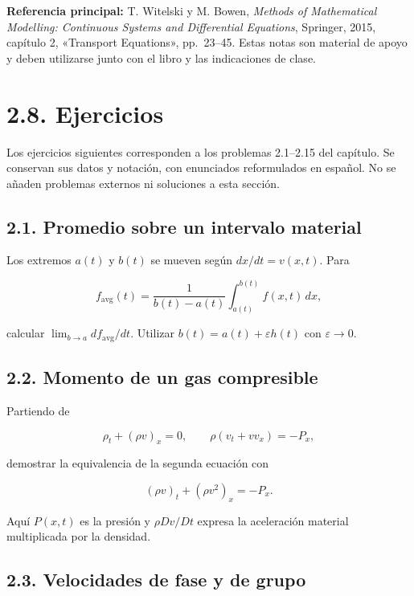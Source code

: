 \documentclass[11pt,a4paper]{article}
\begin{document}
\textbf{Referencia principal:} T. Witelski y M. Bowen, \emph{Methods of
Mathematical Modelling: Continuous Systems and Differential Equations},
Springer, 2015, capítulo 2, «Transport Equations», pp.~23--45. Estas
notas son material de apoyo y deben utilizarse junto con el libro y las
indicaciones de clase.

\hypertarget{ejercicios}{%
\section{2.8. Ejercicios}\label{ejercicios}}

Los ejercicios siguientes corresponden a los problemas 2.1--2.15 del
capítulo. Se conservan sus datos y notación, con enunciados reformulados
en español. No se añaden problemas externos ni soluciones a esta
sección.

\hypertarget{promedio-sobre-un-intervalo-material}{%
\subsection{2.1. Promedio sobre un intervalo
material}\label{promedio-sobre-un-intervalo-material}}

Los extremos \(a(t)\) y \(b(t)\) se mueven según \(dx/dt=v(x,t)\). Para

\[f_{\mathrm{avg}}(t)=\frac{1}{b(t)-a(t)}\int_{a(t)}^{b(t)}f(x,t)\,dx,\]

calcular \(\lim_{b\to a}df_{\mathrm{avg}}/dt\). Utilizar
\(b(t)=a(t)+\varepsilon h(t)\) con \(\varepsilon\to0\).

\hypertarget{momento-de-un-gas-compresible}{%
\subsection{2.2. Momento de un gas
compresible}\label{momento-de-un-gas-compresible}}

Partiendo de

\[\rho_t+(\rho v)_x=0,\qquad \rho(v_t+vv_x)=-P_x,\]

demostrar la equivalencia de la segunda ecuación con

\[(\rho v)_t+(\rho v^2)_x=-P_x.\]

Aquí \(P(x,t)\) es la presión y \(\rho Dv/Dt\) expresa la aceleración
material multiplicada por la densidad.

\hypertarget{velocidades-de-fase-y-de-grupo}{%
\subsection{2.3. Velocidades de fase y de
grupo}\label{velocidades-de-fase-y-de-grupo}}
\end{document}
